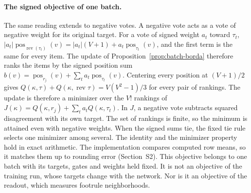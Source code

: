 \paragraph{The signed objective of one batch.} The same reading extends to negative votes. A negative vote acts as a vote of negative weight for its original target. For a vote of signed weight $a_t$ toward $\tau_t$, $|a_t|\operatorname{pos}_{\operatorname{rev}(\tau_t)}(v)=|a_t|(V+1)+a_t\operatorname{pos}_{\tau_t}(v)$, and the first term is the same for every item. The update of Proposition~\ref{prop:batch-borda} therefore ranks the items by the signed position sum $b(v)=\operatorname{pos}_{r_j}(v)+\sum_t a_t\operatorname{pos}_{\tau_t}(v)$. Centering every position at $(V+1)/2$ gives $Q(\kappa,\tau)+Q(\kappa,\operatorname{rev}\tau)=V(V^2-1)/3$ for every pair of rankings. The update is therefore a minimizer over the $V!$ rankings of $J(\kappa)=Q(\kappa,r_j)+\sum_t a_t Q(\kappa,\tau_t)$. In $J$, a negative vote subtracts squared disagreement with its own target. The set of rankings is finite, so the minimum is attained even with negative weights. When the signed sums tie, the fixed tie rule selects one minimizer among several. The identity and the minimizer property hold in exact arithmetic. The implementation compares computed row means, so it matches them up to rounding error (Section~S2). This objective belongs to one batch with its targets, gates and weights held fixed. It is not an objective of the training run, whose targets change with the network. Nor is it an objective of the readout, which measures footrule neighborhoods.

